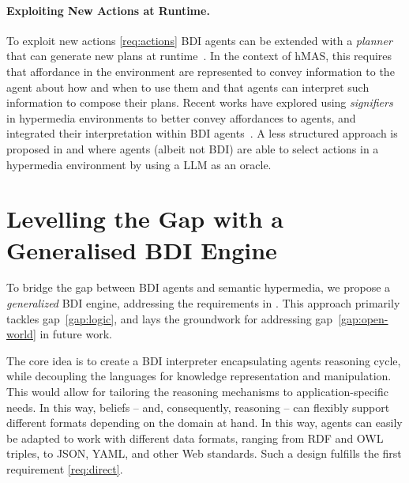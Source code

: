 \documentclass[
]{ceurart}
\begin{document}
\paragraph{Exploiting New Actions at Runtime.}

To exploit new actions \ref{req:actions} \ac{BDI} agents can be extended with a \emph{planner} that can generate new plans at runtime~\cite{MeneguzziS15}. 
In the context of \ac{hMAS}, this requires that affordance in the environment are represented to convey information to the agent about how and when to use them and that agents can interpret such information to compose their plans.
%
Recent works have explored using \emph{signifiers}~\cite{vachtsevanou2023atal} in hypermedia environments to better convey affordances to agents, and integrated their interpretation within \ac{BDI} agents~\cite{vachtsevanou2024atal}.
%
A less structured approach is proposed in \cite{10.1145/3603163.3609077} and \cite{schmid2024kgswc} where agents (albeit not \ac{BDI}) are able to select actions in a hypermedia environment by using a \ac{LLM} as an oracle.

\section{Levelling the Gap with a Generalised \ac{BDI} Engine}
\label{sec:generalized-bdi-engine}

To bridge the gap between \ac{BDI} agents and semantic hypermedia,
we propose a \emph{generalized} \ac{BDI} engine,
addressing the requirements in .
%
This approach primarily tackles gap~\ref{gap:logic}, and lays the groundwork for addressing gap~\ref{gap:open-world} in future work.

The core idea is to create a \ac{BDI} interpreter encapsulating agents reasoning cycle, 
while decoupling the languages for knowledge representation and manipulation. 
%
This would allow for tailoring the reasoning mechanisms to application-specific needs.
%
In this way, 
beliefs 
-- and, consequently, reasoning -- 
can flexibly support different formats depending on the domain at hand.
%
In this way, 
agents can easily be adapted to work with different data formats,
ranging from \ac{RDF} and \ac{OWL} triples, to JSON, YAML, and other Web standards. 
%
Such a design fulfills the first requirement \ref{req:direct}.
\end{document}
